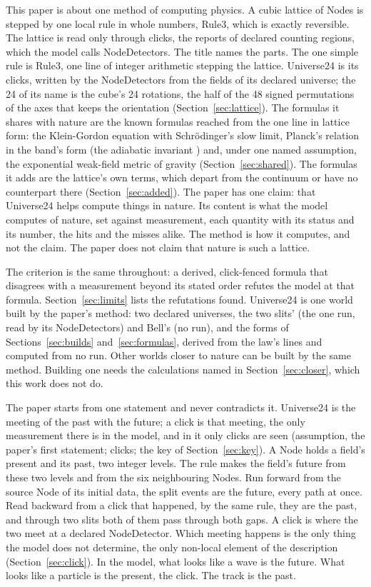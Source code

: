 \documentclass[pdflatex,sn-mathphys-num]{sn-jnl}
\theoremstyle{thmstyleone}
\theoremstyle{thmstyletwo}
\begin{document}
This paper is about one method of computing physics. A cubic lattice of Nodes is stepped by one local rule in whole numbers, Rule3, which is exactly reversible. The lattice is read only through clicks, the reports of declared counting regions, which the model calls NodeDetectors. The title names the parts. The one simple rule is Rule3, one line of integer arithmetic stepping the lattice. Universe24 is its clicks, written by the NodeDetectors from the fields of its declared universe; the 24 of its name is the cube's 24 rotations, the half of the 48 signed permutations of the axes that keeps the orientation (Section~\ref{sec:lattice}). The formulas it shares with nature are the known formulas reached from the one line in lattice form: the Klein-Gordon equation with Schr\"odinger's slow limit, Planck's relation in the band's form (the adiabatic invariant \cite{ehrenfest}) and, under one named assumption, the exponential weak-field metric of gravity (Section~\ref{sec:shared}). The formulas it adds are the lattice's own terms, which depart from the continuum or have no counterpart there (Section~\ref{sec:added}). The paper has one claim: that Universe24 helps compute things in nature. Its content is what the model computes of nature, set against measurement, each quantity with its status and its number, the hits and the misses alike. The method is how it computes, and not the claim. The paper does not claim that nature is such a lattice.

The criterion is the same throughout: a derived, click-fenced formula that disagrees with a measurement beyond its stated order refutes the model at that formula. Section~\ref{sec:limits} lists the refutations found. Universe24 is one world built by the paper's method: two declared universes, the two slits' (the one run, read by its NodeDetectors) and Bell's (no run), and the forms of Sections~\ref{sec:builds} and~\ref{sec:formulas}, derived from the law's lines and computed from no run. Other worlds closer to nature can be built by the same method. Building one needs the calculations named in Section~\ref{sec:closer}, which this work does not do.

The paper starts from one statement and never contradicts it. Universe24 is the meeting of the past with the future; a click is that meeting, the only measurement there is in the model, and in it only clicks are seen (assumption, the paper's first statement; clicks; the key of Section~\ref{sec:key}). A Node holds a field's present and its past, two integer levels. The rule makes the field's future from these two levels and from the six neighbouring Nodes. Run forward from the source Node of its initial data, the split events are the future, every path at once. Read backward from a click that happened, by the same rule, they are the past, and through two slits both of them pass through both gaps. A click is where the two meet at a declared NodeDetector. Which meeting happens is the only thing the model does not determine, the only non-local element of the description (Section~\ref{sec:click}). In the model, what looks like a wave is the future. What looks like a particle is the present, the click. The track is the past.
\end{document}
